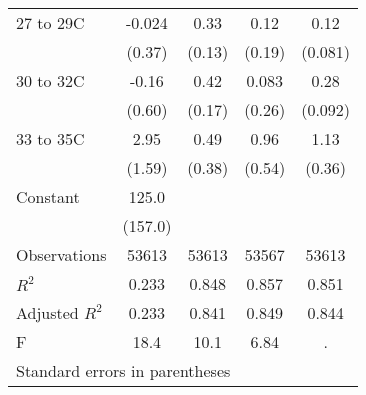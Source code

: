 \documentclass[paper=letterpaper, fontsize=11pt]{article} %
\begin{document}
\begin{longtable}{l*{4}{c}}
27 to 29C           &      -0.024&        0.33&        0.12&        0.12\\
                    &      (0.37)&      (0.13)&      (0.19)&     (0.081)\\
30 to 32C           &       -0.16&        0.42&       0.083&        0.28\\
                    &      (0.60)&      (0.17)&      (0.26)&     (0.092)\\
33 to 35C           &        2.95&        0.49&        0.96&        1.13\\
                    &      (1.59)&      (0.38)&      (0.54)&      (0.36)\\
Constant            &       125.0&            &            &            \\
                    &     (157.0)&            &            &            \\
\hline
Observations        &       53613&       53613&       53567&       53613\\
\(R^{2}\)           &       0.233&       0.848&       0.857&       0.851\\
Adjusted \(R^{2}\)  &       0.233&       0.841&       0.849&       0.844\\
F                   &        18.4&        10.1&        6.84&           .\\
\hline\hline
\multicolumn{5}{l}{\footnotesize Standard errors in parentheses}\\
\end{longtable}

\newpage 
\end{document}
